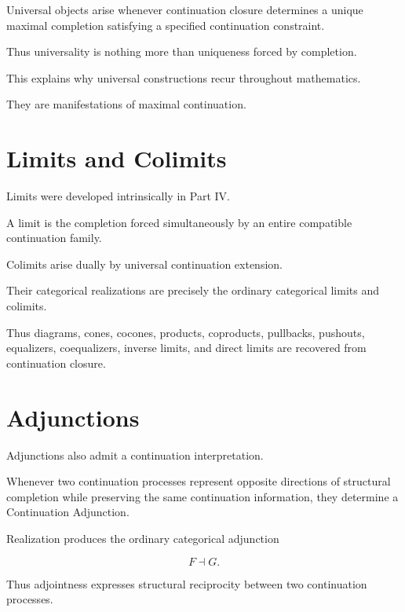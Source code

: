 \documentclass[13pt,openany]{book}
\theoremstyle{plain}
\theoremstyle{definition}
\begin{document}
Universal objects arise whenever continuation closure determines a unique
maximal completion satisfying a specified continuation constraint.

Thus universality is nothing more than uniqueness forced by completion.

This explains why universal constructions recur throughout mathematics.

They are manifestations of maximal continuation.

\section{Limits and Colimits}

Limits were developed intrinsically in Part IV.

A limit is the completion forced simultaneously by an entire compatible
continuation family.

Colimits arise dually by universal continuation extension.

Their categorical realizations are precisely the ordinary categorical limits
and colimits.

Thus diagrams, cones, cocones, products, coproducts, pullbacks, pushouts,
equalizers, coequalizers, inverse limits, and direct limits are recovered from
continuation closure.

\section{Adjunctions}

Adjunctions also admit a continuation interpretation.

Whenever two continuation processes represent opposite directions of structural
completion while preserving the same continuation information, they determine a
Continuation Adjunction.

Realization produces the ordinary categorical adjunction

\[
F\dashv G.
\]

Thus adjointness expresses structural reciprocity between two continuation
processes.

\end{document}
